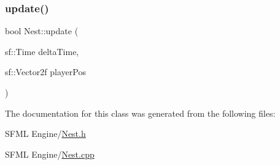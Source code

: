 \mbox{\label{class_nest_a90efe6e30a891f7dd0620d4f14c3cef6}} 
\subsubsection{\texorpdfstring{update()}{update()}}
{\footnotesize\ttfamily bool Nest\+::update (\begin{DoxyParamCaption}\item[{sf\+::\+Time}]{delta\+Time,  }\item[{sf\+::\+Vector2f}]{player\+Pos }\end{DoxyParamCaption})}



The documentation for this class was generated from the following files\+:\begin{DoxyCompactItemize}
\item 
S\+F\+M\+L Engine/\hyperlink{_nest_8h}{Nest.\+h}\item 
S\+F\+M\+L Engine/\hyperlink{_nest_8cpp}{Nest.\+cpp}\end{DoxyCompactItemize}

